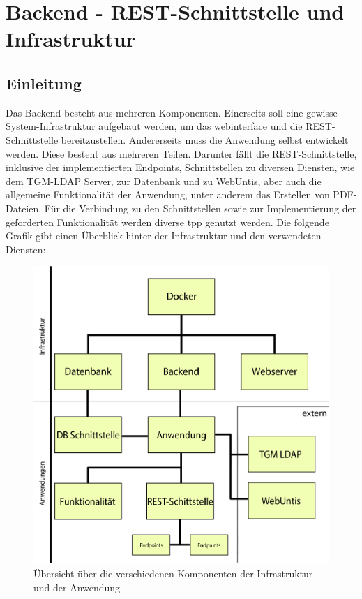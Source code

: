 
\section{Backend - REST-Schnittstelle und Infrastruktur}
	\subsection{Einleitung}
	Das Backend besteht aus mehreren Komponenten. Einerseits soll eine gewisse System-Infrastruktur aufgebaut werden, um das \gls{webinterface} und die REST-Schnittstelle bereitzustellen. Andererseits muss die Anwendung selbst entwickelt werden. Diese besteht aus mehreren Teilen. Darunter fällt die REST-Schnittstelle, inklusive der implementierten Endpoints, Schnittstellen zu diversen Diensten, wie dem TGM-LDAP Server, zur Datenbank und zu WebUntis, aber auch die allgemeine Funktionalität der Anwendung, unter anderem das Erstellen von PDF-Dateien. Für die Verbindung zu den Schnittstellen sowie zur Implementierung der geforderten Funktionalität werden diverse  \gls{tpp} genutzt werden. Die folgende Grafik gibt einen Überblick hinter der Infrastruktur und den verwendeten Diensten:
	\begin{figure}[H]
		\centering
		\includegraphics[width=0.8\linewidth]{images/uebersicht}
		\caption[Übersicht über die Komponenten]{Übersicht über die verschiedenen Komponenten der Infrastruktur und der Anwendung}
		\label{fig:uebersicht}
	\end{figure}
	
